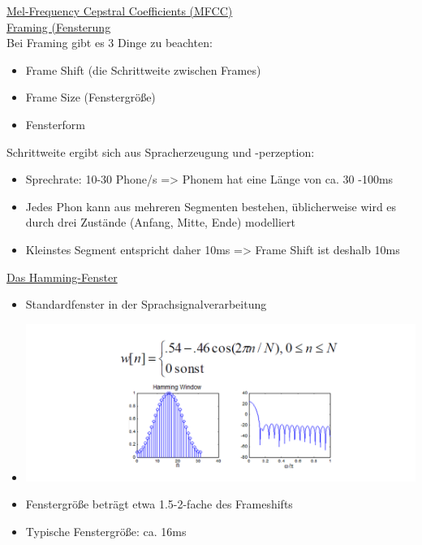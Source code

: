 \documentclass[a4paper,10pt,oneside]{article}
\begin{document}
\underline{Mel-Frequency Cepstral Coefficients (MFCC)} \\
\underline{Framing (Fensterung} \\
Bei Framing gibt es 3 Dinge zu beachten:
	\begin{itemize}
		\item Frame Shift (die Schrittweite zwischen Frames)
		\item Frame Size (Fenstergröße)
		\item Fensterform
	\end{itemize}

Schrittweite ergibt sich aus Spracherzeugung und -perzeption:
	\begin{itemize}
		\item Sprechrate: 10-30 Phone/s => Phonem hat eine Länge von ca. 30 -100ms
		\item Jedes Phon kann aus mehreren Segmenten bestehen, üblicherweise wird es durch drei Zustände (Anfang, Mitte, Ende) modelliert
		\item Kleinstes Segment entspricht daher 10ms => Frame Shift ist deshalb 10ms
	\end{itemize}
	
\underline{Das Hamming-Fenster} \\
	\begin{itemize}
		\item Standardfenster in der Sprachsignalverarbeitung
		\item[] \includegraphics[scale=0.15]{Grafiken/1312.png}
		\item Fenstergröße beträgt etwa 1.5-2-fache des Frameshifts
		\item Typische Fenstergröße: ca. 16ms
	\end{itemize}
	
\end{document}
